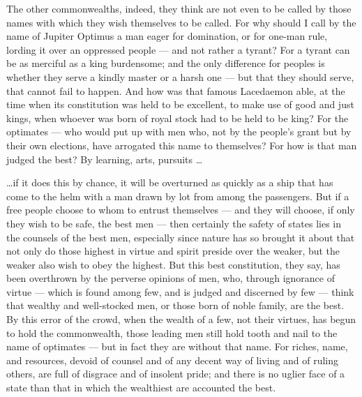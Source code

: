  The other commonwealths, indeed, they think are not even to be called by those names with which they wish themselves to be called. For why should I call by the name of Jupiter Optimus a man eager for domination, or for one-man rule, lording it over an oppressed people --- and not rather a tyrant? For a tyrant can be as merciful as a king burdensome; and the only difference for peoples is whether they serve a kindly master or a harsh one --- but that they should serve, that cannot fail to happen. And how was that famous Lacedaemon able, at the time when its constitution was held to be excellent, to make use of good and just kings, when whoever was born of royal stock had to be held to be king? For the optimates --- who would put up with men who, not by the people's grant but by their own elections, have arrogated this name to themselves? For how is that man judged the best? By learning, arts, pursuits \ldots

 \ldots if it does this by chance, it will be overturned as quickly as a ship that has come to the helm with a man drawn by lot from among the passengers. But if a free people choose to whom to entrust themselves --- and they will choose, if only they wish to be safe, the best men --- then certainly the safety of states lies in the counsels of the best men, especially since nature has so brought it about that not only do those highest in virtue and spirit preside over the weaker, but the weaker also wish to obey the highest. But this best constitution, they say, has been overthrown by the perverse opinions of men, who, through ignorance of virtue --- which is found among few, and is judged and discerned by few --- think that wealthy and well-stocked men, or those born of noble family, are the best. By this error of the crowd, when the wealth of a few, not their virtues, has begun to hold the commonwealth, those leading men still hold tooth and nail to the name of optimates --- but in fact they are without that name. For riches, name, and resources, devoid of counsel and of any decent way of living and of ruling others, are full of disgrace and of insolent pride; and there is no uglier face of a state than that in which the wealthiest are accounted the best.

